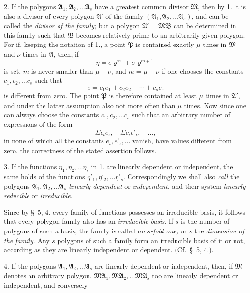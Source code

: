 \documentclass{article}
\begin{document}
2. If the polygons $\mathfrak{A}_{1}, \mathfrak{A}_{2}, \ldots \mathfrak{A}_{s}$ have a greatest common divisor $\mathfrak{M}$, then by 1. it is also a divisor of every polygon $\mathfrak{A}'$ of the family $(\mathfrak{A}_{1}, \mathfrak{A}_{2}, \ldots \mathfrak{A}_{s})$, and can be called the \emph{divisor of the family}; but a polygon $\mathfrak{A}' = \mathfrak{M}\mathfrak{B}$ can be determined in this family such that $\mathfrak{B}$ becomes relatively prime to an arbitrarily given polygon. For if, keeping the notation of 1., a point $\mathfrak{P}$ is contained exactly $\mu$ times in $\mathfrak{M}$ and $\nu$ times in $\mathfrak{A}$, then, if
\[ \eta = e\varrho^{m} + \sigma\varrho^{m+1} \]
is set, $m$ is never smaller than $\mu - \nu$, and $m = \mu - \nu$ if one chooses the constants $c_{1}, c_{2}, \ldots c_{s}$ such that
\[ e = c_{1}e_{1} + c_{2}e_{2} + \cdots + c_{s}e_{s} \]
is different from zero. The point $\mathfrak{P}$ is therefore contained at least $\mu$ times in $\mathfrak{A}'$, and under the latter assumption also not more often than $\mu$ times. Now since one can always choose the constants $c_{1}, c_{2}, \ldots c_{s}$ such that an arbitrary number of expressions of the form
\[ \Sigma c_{\iota}e_{\iota}, \quad \Sigma c_{\iota}e'_{\iota}, \quad \ldots, \]
in none of which all the constants $e_{\iota}, e'_{\iota}, \ldots$ vanish, have values different from zero, the correctness of the stated assertion follows.


3. If the functions $\eta_{1}, \eta_{2}, \ldots \eta_{s}$ in 1. are linearly dependent or independent, the same holds of the functions $\eta'_{1}, \eta'_{2}, \ldots \eta'_{s}$. Correspondingly we shall also \emph{call} the polygons $\mathfrak{A}_{1}, \mathfrak{A}_{2}, \ldots \mathfrak{A}_{s}$ \emph{linearly dependent} or \emph{independent}, and their system \emph{linearly reducible} or \emph{irreducible.}

Since by §~5, 4. every family of functions possesses an irreducible basis, it follows that every polygon family also has an \emph{irreducible basis}. If $s$ is the number of polygons of such a basis, the family is called \emph{an $s$-fold one,} or $s$ the \emph{dimension of the family}. Any $s$ polygons of such a family form an irreducible basis of it or not, according as they are linearly independent or dependent. (Cf.\ §~5, 4.).

4. If the polygons $\mathfrak{A}_{1}, \mathfrak{A}_{2}, \ldots \mathfrak{A}_{s}$ are linearly dependent or independent, then, if $\mathfrak{M}$ denotes an arbitrary polygon, $\mathfrak{M}\mathfrak{A}_{1}, \mathfrak{M}\mathfrak{A}_{2}, \ldots \mathfrak{M}\mathfrak{A}_{s}$ too are linearly dependent or independent, and conversely.
\end{document}
